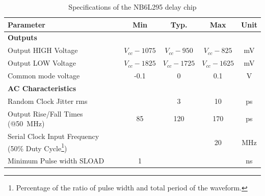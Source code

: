 \begin{table}[tbh]
	\caption[NB6L295 Characteristics]{Specifications of the NB6L295 delay chip \cite{NB6L295}}
	\label{tab:nb6l295}
	\begin{minipage}{\textwidth}
		\centering
		\begin{tabularx}{\textwidth}{Xcccc}
			\toprule
			\textbf{Parameter} & \textbf{Min} & \textbf{Typ.} & \textbf{Max} & \textbf{Unit}\\
			\midrule
			\textbf{Outputs} &&&& \\
			Output HIGH Voltage & $V_{cc} - 1075$ & $V_{cc} - 950$ & $V_{cc} - 825$ & mV\\
			Output LOW Voltage & $V_{cc} - 1825$ & $V_{cc} - 1725$ & $V_{cc} - 1625$ & mV\\
			Common mode voltage & -0.1 & 0 & 0.1 & V\\[0.3cm]
			\textbf{AC Characteristics} &&&&\\
			Random Clock Jitter \gls{rms}&  & 3 & 10 & ps\\
			Output Rise/Fall Times (@\SI{50}{\mega \hertz}) & 85 & 120 & 170 & ps\\
			Serial Clock Input Frequency (50\% Duty Cycle\footnote{Percentage of the ratio of pulse width and total period of the waveform.}) &  &  & 20 & MHz\\
			Minimum Pulse width SLOAD  & 1 &  &  & ns\\
			\bottomrule
		\end{tabularx}
	\end{minipage}
\end{table}



